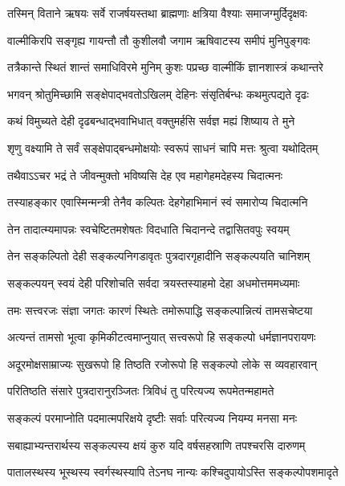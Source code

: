 \twolineshloka
{तस्मिन् विताने ऋषयः सर्वे राजर्षयस्तथा}
{ब्राह्मणाः क्षत्रिया वैश्याः समाजग्मुर्दिदृक्षवः} %

\twolineshloka
{वाल्मीकिरपि सङ्गृह्य गायन्तौ तौ कुशीलवौ}
{जगाम ऋषिवाटस्य समीपं मुनिपुङ्गवः} %

\twolineshloka
{तत्रैकान्ते स्थितं शान्तं समाधिविरमे मुनिम्}
{कुशः पप्रच्छ वाल्मीकिं ज्ञानशास्त्रं कथान्तरे} %

\twolineshloka
{भगवन् श्रोतुमिच्छामि सङ्क्षेपाद्भवतोऽखिलम्}
{देहिनः संसृतिर्बन्धः कथमुत्पद्यते दृढः} %

\twolineshloka
{कथं विमुच्यते देही दृढबन्धाद्भवाभिधात्}
{वक्तुमर्हसि सर्वज्ञ मह्यं शिष्याय ते मुने} %


\twolineshloka
{शृणु वक्ष्यामि ते सर्वं सङ्क्षेपाद्बन्धमोक्षयोः}
{स्वरूपं साधनं चापि मत्तः श्रुत्वा यथोदितम्} %

\twolineshloka
{तथैवाऽऽचर भद्रं ते जीवन्मुक्तो भविष्यसि}
{देह एव महागेहमदेहस्य चिदात्मनः} %

\twolineshloka
{तस्याहङ्कार एवास्मिन्मन्त्री तेनैव कल्पितः}
{देहगेहाभिमानं स्वं समारोप्य चिदात्मनि} %

\twolineshloka
{तेन तादात्म्यमापन्नः स्वचेष्टितमशेषतः}
{विदधाति चिदानन्दे तद्वासितवपुः स्वयम्} %

\twolineshloka
{तेन सङ्कल्पितो देही सङ्कल्पनिगडावृतः}
{पुत्रदारगृहादीनि सङ्कल्पयति चानिशम्} %

\twolineshloka
{सङ्कल्पयन् स्वयं देही परिशोचति सर्वदा}
{त्रयस्तस्याहमो देहा अधमोत्तममध्यमाः} %

\twolineshloka
{तमः सत्त्वरजः संज्ञा जगतः कारणं स्थितेः}
{तमोरूपाद्धि सङ्कल्पान्नित्यं तामसचेष्टया} %

\twolineshloka
{अत्यन्तं तामसो भूत्वा कृमिकीटत्वमाप्नुयात्}
{सत्त्वरूपो हि सङ्कल्पो धर्मज्ञानपरायणः} %

\twolineshloka
{अदूरमोक्षसाम्राज्यः सुखरूपो हि तिष्ठति}
{रजोरूपो हि सङ्कल्पो लोके स व्यवहारवान्} %

\twolineshloka
{परितिष्ठति संसारे पुत्रदारानुरञ्जितः}
{त्रिविधं तु परित्यज्य रूपमेतन्महामते} %

\twolineshloka
{सङ्कल्पं परमाप्नोति पदमात्मपरिक्षये}
{दृष्टीः सर्वाः परित्यज्य नियम्य मनसा मनः} %

\twolineshloka
{सबाह्याभ्यन्तरार्थस्य सङ्कल्पस्य क्षयं कुरु}
{यदि वर्षसहस्राणि तपश्चरसि दारुणम्} %

\twolineshloka
{पातालस्थस्य भूस्थस्य स्वर्गस्थस्यापि तेऽनघ}
{नान्यः कश्चिदुपायोऽस्ति सङ्कल्पोपशमादृते} %

